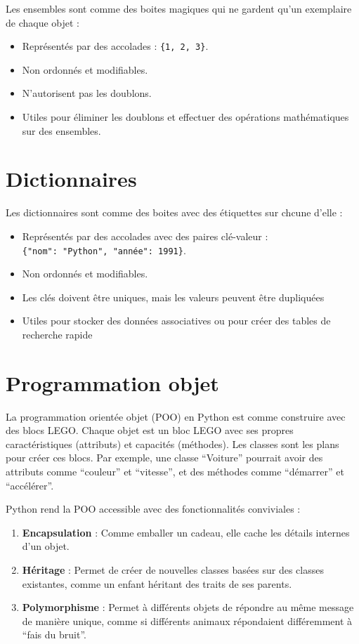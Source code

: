\documentclass[
  11pt,
  letterpaper,
  open=any,
  twoside=false,
  french]{scrbook}
\begin{document}
Les ensembles sont comme des boites magiques qui ne gardent qu'un
exemplaire de chaque objet :

\begin{itemize}
\item
  Représentés par des accolades : \texttt{\{1,\ 2,\ 3\}}.
\item
  Non ordonnés et modifiables.
\item
  N'autorisent pas les doublons.
\item
  Utiles pour éliminer les doublons et effectuer des opérations
  mathématiques sur des ensembles.
\end{itemize}

\section{Dictionnaires}\label{dictionnaires}

Les dictionnaires sont comme des boites avec des étiquettes sur chcune
d'elle :

\begin{itemize}
\item
  Représentés par des accolades avec des paires clé-valeur :
  \texttt{\{"nom":\ "Python",\ "année":\ 1991\}}.
\item
  Non ordonnés et modifiables.
\item
  Les clés doivent être uniques, mais les valeurs peuvent être
  dupliquées
\item
  Utiles pour stocker des données associatives ou pour créer des tables
  de recherche rapide
\end{itemize}

\section{Programmation objet}\label{programmation-objet}

La programmation orientée objet (POO) en Python est comme construire
avec des blocs LEGO. Chaque objet est un bloc LEGO avec ses propres
caractéristiques (attributs) et capacités (méthodes). Les classes sont
les plans pour créer ces blocs. Par exemple, une classe ``Voiture''
pourrait avoir des attributs comme ``couleur'' et ``vitesse'', et des
méthodes comme ``démarrer'' et ``accélérer''.

Python rend la POO accessible avec des fonctionnalités conviviales :

\begin{enumerate}
\def\labelenumi{\arabic{enumi}.}
\item
  \textbf{Encapsulation} : Comme emballer un cadeau, elle cache les
  détails internes d'un objet.
\item
  \textbf{Héritage} : Permet de créer de nouvelles classes basées sur
  des classes existantes, comme un enfant héritant des traits de ses
  parents.
\item
  \textbf{Polymorphisme} : Permet à différents objets de répondre au
  même message de manière unique, comme si différents animaux
  répondaient différemment à ``fais du bruit''.
\end{enumerate}
\end{document}

